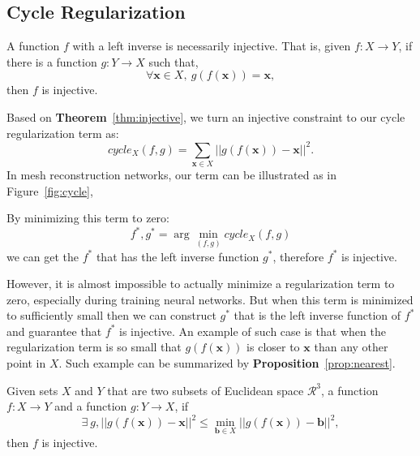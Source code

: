 \subsection{Cycle Regularization}
\label{subsec:cyclereg}
\begin{m_thm}
\label{thm:injective}
A function $f$ with a left inverse is necessarily injective. That is, given $f:X \rightarrow Y$, if there is a function $g:Y \rightarrow X$ such that,
\begin{equation}
\label{equ:injective}
\forall \mathbf{x} \in X,~g(f(\mathbf{x})) = \mathbf{x},
\end{equation}
then $f$ is injective.
\end{m_thm}

Based on \textbf{Theorem}~\ref{thm:injective}, we turn an injective constraint to our cycle regularization term as:
\begin{equation}
\label{equ:cycle_term}
cycle_X(f,g)=\sum_{\mathbf{x}\in X}||g(f(\mathbf{x})) - \mathbf{x}||^2.
\end{equation}
In mesh reconstruction networks, our term can be illustrated as in Figure~\ref{fig:cycle},

By minimizing this term to zero:
\begin{equation}
f^*,g^* = \arg\min_{(f,g)} cycle_X(f,g)
\end{equation}
we can get the $f^*$ that has the left inverse function $g^*$, therefore $f^*$ is injective. 

However, it is almost impossible to actually minimize a regularization term to zero, especially during training neural networks. But when this term is minimized to sufficiently small then we can construct $g^*$ that is the left inverse function of $f^*$ and guarantee that $f^*$ is injective. An example of such case is that when the regularization term is so small that $g(f(\mathbf{x}))$ is closer to $\mathbf{x}$ than any other point in $X$. Such example can be summarized by \textbf{Proposition}~\ref{prop:nearest}.

\begin{m_prop}
	\label{prop:nearest}
	Given sets $X$ and $Y$ that are two subsets of Euclidean space $\mathcal{R}^3$, a function $f:X \rightarrow Y$  and a function $g:Y \rightarrow X$, if
	\begin{equation}
	\exists~g, || g(f(\mathbf{x})) - \mathbf{x} ||^2 \leq \min_{\mathbf{b} \in X}|| g(f(\mathbf{x})) - \mathbf{b} ||^2,
	\end{equation}
	then $f$ is injective.
\end{m_prop}

